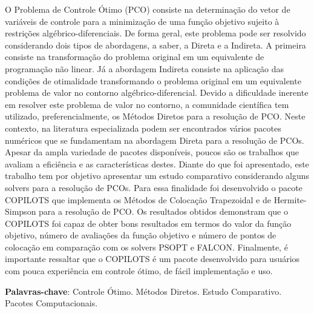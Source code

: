 O Problema de Controle Ótimo (PCO) consiste na determinação do vetor de variáveis de controle para a minimização de uma função objetivo sujeito à restrições algébrico-diferenciais. De forma geral, este problema pode ser resolvido considerando dois tipos de abordagens, a saber, a Direta e a Indireta. A primeira consiste na transformação do problema original em um equivalente de programação não linear. Já a abordagem Indireta consiste na aplicação das condições de otimalidade transformando o problema original em um equivalente problema de valor no contorno algébrico-diferencial. Devido a dificuldade inerente em resolver este problema de valor no contorno, a comunidade científica tem utilizado, preferencialmente, os Métodos Diretos para a resolução de PCO. Neste contexto, na literatura especializada podem ser encontrados vários pacotes numéricos que se fundamentam na abordagem Direta para a resolução de PCOs. Apesar da ampla variedade de pacotes disponíveis, poucos são os trabalhos que avaliam a eficiência e as características destes. Diante do que foi apresentado, este trabalho tem por objetivo apresentar um estudo comparativo considerando alguns solvers para a resolução de PCOs. Para essa finalidade foi desenvolvido o pacote COPILOTS que implementa os Métodos de Colocação Trapezoidal e de Hermite-Simpson para a resolução de PCO. Os resultados obtidos demonstram que o COPILOTS foi capaz de obter bons resultados em termos do valor da função objetivo, número de avaliações da função objetivo e número de pontos de colocação em comparação com os solvers PSOPT e FALCON. Finalmente, é importante ressaltar que o COPILOTS é um pacote desenvolvido para usuários com pouca experiência em controle ótimo, de fácil implementação e uso.

\textbf{Palavras-chave}: Controle Ótimo. Métodos Diretos. Estudo Comparativo. Pacotes Computacionais.
